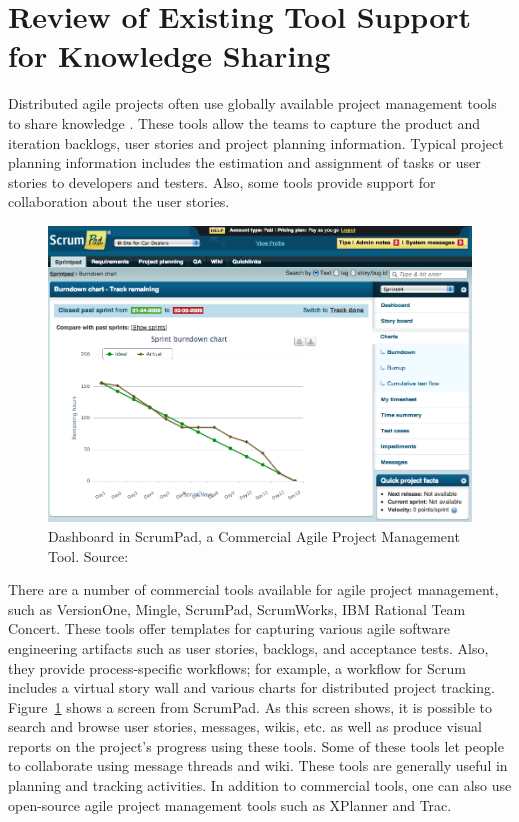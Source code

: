 \section{Review of Existing Tool Support for Knowledge Sharing}
Distributed agile projects often use globally available project management tools to share knowledge \cite{essential_communication}. These tools allow the teams to capture the product and iteration backlogs, user stories and project planning information. Typical project planning information includes the estimation and assignment of tasks or user stories to developers and testers. Also, some tools provide support for collaboration about the user stories.

\begin{figure}[!ht]
	\centering
	\includegraphics[width=\textwidth]{Scrumpad.png}
    \caption{Dashboard in ScrumPad, a Commercial Agile Project Management Tool. Source: \cite{scrum_pad}}
	\label{fig:scrumpad}
\end{figure}


There are a number of commercial tools available for agile project management, such as VersionOne\cite{version_one}, Mingle\cite{mingle}, ScrumPad\cite{scrum_pad}, ScrumWorks\cite{scrum_works}, IBM Rational Team Concert\cite{ibm_rtc}. These tools offer templates for capturing various agile software engineering artifacts such as user stories, backlogs, and acceptance tests. Also, they provide process-specific workflows; for example, a workflow for Scrum includes a virtual story wall and various charts for distributed project tracking. Figure~\ref{fig:scrumpad} shows a screen from ScrumPad. As this screen shows, it is possible to search and browse user stories, messages, wikis, etc. as well as produce visual reports on the project's progress using these tools. Some of these tools let people to collaborate using message threads and wiki. These tools are generally useful in planning and tracking activities. In addition to commercial tools, one can also use open-source agile project management tools such as XPlanner\cite{xplanner} and Trac\cite{trac}.

